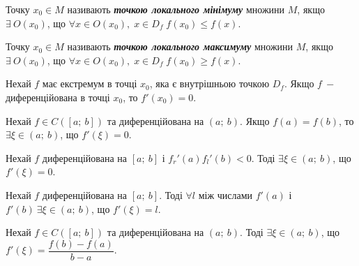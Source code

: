 \begin{definition}
        Точку $x_0 \in M$ називають \textcolor{NavyBlue}{\textbf{\textit{{точкою локального мінімуму}}}} множини $M$, якщо \newline $\exists \: O(x_0)$, що  $\forall x \in O(x_0), \; x \in D_f \; f(x_0) \leqslant  f(x).$
\end{definition}

\begin{definition}
        Точку $x_0 \in M$ називають \textcolor{NavyBlue}{\textbf{\textit{точкою локального максимуму}}} множини $M$, якщо \newline $\exists \: O(x_0)$, що  $\forall x \in O(x_0), \; x \in D_f \; f(x_0) \geqslant  f(x).$
\end{definition}

\begin{theorem}
        Нехай $f$ має екстремум в точці $x_0$, яка є внутрішньою точкою $D_f$. \newline Якщо $f \: -$ диференційована в точці $x_0$, то $f'(x_0) = 0$.
\end{theorem}

\begin{theorem}
        Нехай $f \in C([a; \: b])$ та диференційована на $(a; \: b)$. Якщо $f(a) = f(b)$, то $\exists \xi \in (a; \: b)$, що $f'(\xi) = 0$.
\end{theorem}

\begin{theorem}
        Нехай $f$ диференційована на $[a; \: b]$ і $f_r'(a)  f_l'(b) < 0$. Тоді $\exists \xi \in (a; \: b)$, що $f'(\xi) = 0$.
\end{theorem}

\begin{theorem}
         Нехай $f$ диференційована на $[a; \: b]$. Тоді $\forall l$ між числами $f'(a)$ і $f'(b) \ \exists \xi \in (a; \: b)$, що $f'(\xi) = l$.
\end{theorem}

\begin{theorem}
          Нехай $f \in C([a; \: b])$ та диференційована на $(a; \: b)$. Тоді $\exists \xi \in (a; \: b)$, що $f'(\xi) = \dfrac{f(b) - f(a)}{b - a}$.
\end{theorem}

